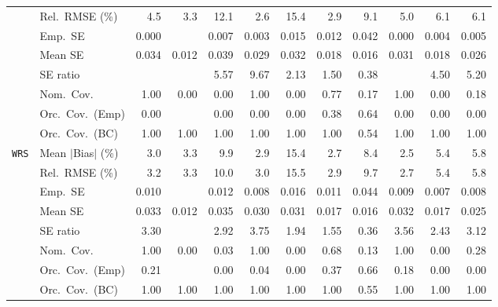 \begin{landscape}
\begin{longtable}{llrrrrrrrrrr}
 & Rel.\ RMSE (\%) & 4.5 & \cellcolor{rankthree}3.3 & 12.1 & \cellcolor{rankone}2.6 & 15.4 & \cellcolor{ranktwo}2.9 & 9.1 & 5.0 & 6.1 & 6.1 \\
 & Emp.\ SE & 0.000 &  & 0.007 & 0.003 & 0.015 & 0.012 & 0.042 & 0.000 & 0.004 & 0.005 \\
 & Mean SE & 0.034 & 0.012 & 0.039 & 0.029 & 0.032 & 0.018 & 0.016 & 0.031 & 0.018 & 0.026 \\
 & SE ratio &  &  & 5.57 & 9.67 & \cellcolor{rankthree}2.13 & \cellcolor{rankone}1.50 & \cellcolor{ranktwo}0.38 &  & 4.50 & 5.20 \\
 & Nom.\ Cov. & \cellcolor{rankone}1.00 & 0.00 & 0.00 & \cellcolor{ranktwo}1.00 & 0.00 & 0.77 & 0.17 & \cellcolor{rankthree}1.00 & 0.00 & 0.18 \\
 & Orc.\ Cov.\ (Emp) & \cellcolor{rankthree}0.00 &  & 0.00 & 0.00 & 0.00 & \cellcolor{ranktwo}0.38 & \cellcolor{rankone}0.64 & 0.00 & 0.00 & 0.00 \\
 & Orc.\ Cov.\ (BC) & \cellcolor{rankone}1.00 & \cellcolor{ranktwo}1.00 & \cellcolor{rankthree}1.00 & 1.00 & 1.00 & 1.00 & 0.54 & 1.00 & 1.00 & 1.00 \\
\addlinespace[2pt]
\quad \texttt{WRS} & Mean $|$Bias$|$ (\%) & 3.0 & 3.3 & 9.9 & \cellcolor{rankthree}2.9 & 15.4 & \cellcolor{ranktwo}2.7 & 8.4 & \cellcolor{rankone}2.5 & 5.4 & 5.8 \\
 & Rel.\ RMSE (\%) & 3.2 & 3.3 & 10.0 & \cellcolor{rankthree}3.0 & 15.5 & \cellcolor{ranktwo}2.9 & 9.7 & \cellcolor{rankone}2.7 & 5.4 & 5.8 \\
 & Emp.\ SE & 0.010 &  & 0.012 & 0.008 & 0.016 & 0.011 & 0.044 & 0.009 & 0.007 & 0.008 \\
 & Mean SE & 0.033 & 0.012 & 0.035 & 0.030 & 0.031 & 0.017 & 0.016 & 0.032 & 0.017 & 0.025 \\
 & SE ratio & 3.30 &  & 2.92 & 3.75 & \cellcolor{rankthree}1.94 & \cellcolor{rankone}1.55 & \cellcolor{ranktwo}0.36 & 3.56 & 2.43 & 3.12 \\
 & Nom.\ Cov. & \cellcolor{rankone}1.00 & 0.00 & 0.03 & \cellcolor{ranktwo}1.00 & 0.00 & 0.68 & 0.13 & \cellcolor{rankthree}1.00 & 0.00 & 0.28 \\
 & Orc.\ Cov.\ (Emp) & \cellcolor{rankthree}0.21 &  & 0.00 & 0.04 & 0.00 & \cellcolor{ranktwo}0.37 & \cellcolor{rankone}0.66 & 0.18 & 0.00 & 0.00 \\
 & Orc.\ Cov.\ (BC) & \cellcolor{rankone}1.00 & \cellcolor{ranktwo}1.00 & \cellcolor{rankthree}1.00 & 1.00 & 1.00 & 1.00 & 0.55 & 1.00 & 1.00 & 1.00 \\

\end{longtable}
\end{landscape}
